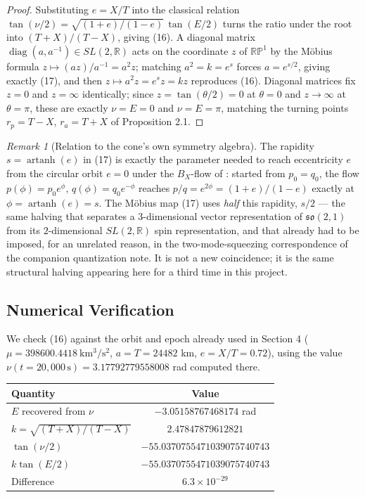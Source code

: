\documentclass[12pt]{amsart}
\theoremstyle{plain}
\theoremstyle{remark}
\newtheorem*{remark}{Remark}
\begin{document}
\begin{proof}
Substituting $e=X/T$ into the classical relation $\tan(\nu/2)=\sqrt{(1+e)/(1-e)}\,\tan(E/2)$ turns the ratio under the root into $(T+X)/(T-X)$, giving (16). A diagonal matrix $\operatorname{diag}(a,a^{-1})\in SL(2,\mathbb R)$ acts on the coordinate $z$ of $\mathbb{RP}^1$ by the Möbius formula $z\mapsto (az)/a^{-1}=a^2z$; matching $a^2=k=e^s$ forces $a=e^{s/2}$, giving exactly (17), and then $z\mapsto a^2z=e^sz=kz$ reproduces (16). Diagonal matrices fix $z=0$ and $z=\infty$ identically; since $z=\tan(\theta/2)=0$ at $\theta=0$ and $z\to\infty$ at $\theta=\pi$, these are exactly $\nu=E=0$ and $\nu=E=\pi$, matching the turning points $r_p=T-X$, $r_a=T+X$ of Proposition 2.1. \qedhere
\end{proof}

\begin{remark}[Relation to the cone's own symmetry algebra]
The rapidity $s=\operatorname{artanh}(e)$ in (17) is exactly the parameter needed to reach eccentricity $e$ from the circular orbit $e=0$ under the $B_X$-flow of \cite{Ebert2026EigenCoord}: started from $p_0=q_0$, the flow $p(\phi)=p_0e^\phi,\,q(\phi)=q_0e^{-\phi}$ reaches $p/q=e^{2\phi}=(1+e)/(1-e)$ exactly at $\phi=\operatorname{artanh}(e)=s$. The Möbius map (17) uses \emph{half} this rapidity, $s/2$ --- the same halving that separates a $3$-dimensional vector representation of $\mathfrak{so}(2,1)$ from its $2$-dimensional $SL(2,\mathbb R)$ spin representation, and that already had to be imposed, for an unrelated reason, in the two-mode-squeezing correspondence of the companion quantization note. It is not a new coincidence; it is the same structural halving appearing here for a third time in this project.
\end{remark}

\subsection*{Numerical Verification}

We check (16) against the orbit and epoch already used in Section 4 ($\mu=398600.4418\ \mathrm{km^3/s^2}$, $a=T=24482$ km, $e=X/T=0.72$), using the value $\nu(t{=}20{,}000\,\mathrm s)=3.17792779558008$ rad computed there.

\begin{center}
\begin{tabular}{lc}
\hline
Quantity & Value \\
\hline
$E$ recovered from $\nu$ & $-3.05158767468174$ rad \\
$k=\sqrt{(T+X)/(T-X)}$ & $2.47847879612821$ \\
$\tan(\nu/2)$ & $-55.0370755471039075740743$ \\
$k\tan(E/2)$ & $-55.0370755471039075740743$ \\
Difference & $6.3\times10^{-29}$ \\
\hline
\end{tabular}
\end{center}
\end{document}

